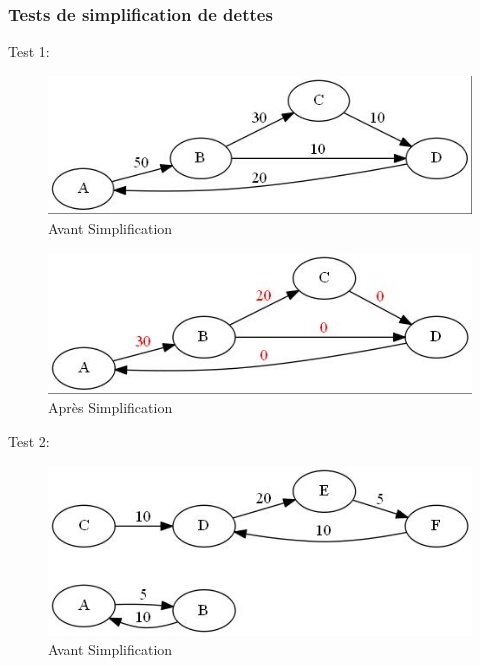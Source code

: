 \documentclass[12pt, oneside]{article}
\begin{document}
\subsubsection{Tests de simplification de dettes}
Test 1:
\begin{figure}[!h]
    \centering
    \includegraphics[scale=0.7,trim=3 3 3 3,clip]{simplify1before}
    \caption{Avant Simplification}
\end{figure}
\begin{figure}[!h]
    \centering
    \includegraphics[scale=0.7,trim=3 3 3 3,clip]{simplify1after}
    \caption{Après Simplification}
\end{figure}
\newpage
\FloatBarrier
Test 2:
\begin{figure}[!h]
    \centering
    \includegraphics[scale=0.7,trim=3 3 3 3,clip]{simplify2before}
    \caption{Avant Simplification}
\end{figure}
\end{document}
